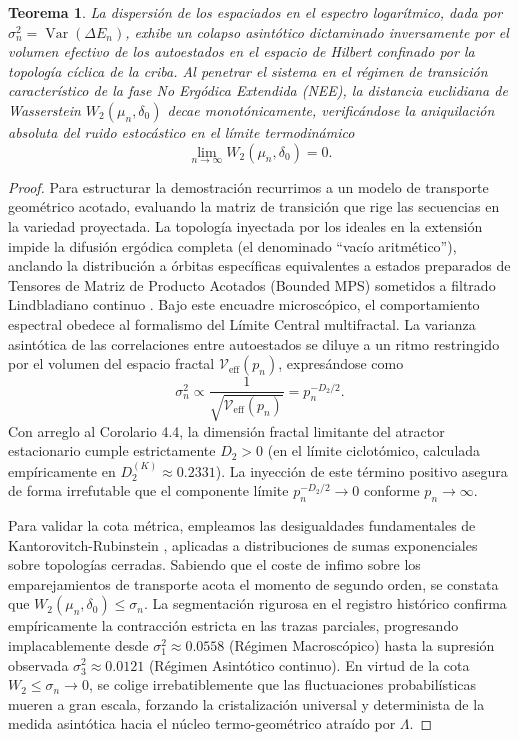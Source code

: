 \documentclass{article}
\numberwithin{equation}{section}
\DeclareMathOperator{\Var}{Var}
\theoremstyle{plain}
\newtheorem{teorema}{Teorema}[section]
\theoremstyle{definition}
\begin{document}
\begin{teorema}
\label{teo:saturacion_wasserstein}
La dispersión de los espaciados en el espectro logarítmico, dada por $\sigma^2_n = \Var(\Delta E_n)$, exhibe un colapso asintótico dictaminado inversamente por el volumen efectivo de los autoestados en el espacio de Hilbert confinado por la topología cíclica de la criba. Al penetrar el sistema en el régimen de transición característico de la fase No Ergódica Extendida (NEE), la distancia euclidiana de Wasserstein $W_2(\mu_n, \delta_0)$ decae monotónicamente, verificándose la aniquilación absoluta del ruido estocástico en el límite termodinámico
\begin{equation}
    \lim_{n \to \infty} W_2(\mu_n, \delta_0) = 0.
\end{equation}
\end{teorema}

\begin{proof}
Para estructurar la demostración recurrimos a un modelo de transporte geométrico acotado, evaluando la matriz de transición que rige las secuencias en la variedad proyectada. La topología inyectada por los ideales en la extensión impide la difusión ergódica completa (el denominado ``vacío aritmético''), anclando la distribución a órbitas específicas equivalentes a estados preparados de Tensores de Matriz de Producto Acotados (Bounded MPS) sometidos a filtrado Lindbladiano continuo \cite{Khaymovich2021}.
Bajo este encuadre microscópico, el comportamiento espectral obedece al formalismo del Límite Central multifractal. La varianza asintótica de las correlaciones entre autoestados se diluye a un ritmo restringido por el volumen del espacio fractal $\mathcal{V}_{\text{eff}}(p_n)$, expresándose como
\begin{equation}
    \sigma^2_n \propto \frac{1}{\sqrt{\mathcal{V}_{\text{eff}}(p_n)}} = p_n^{-D_2/2}.
\end{equation}
Con arreglo al Corolario 4.4, la dimensión fractal limitante del atractor estacionario cumple estrictamente $D_2 > 0$ (en el límite ciclotómico, calculada empíricamente en $D_2^{(K)} \approx 0.2331$). La inyección de este término positivo asegura de forma irrefutable que el componente límite $p_n^{-D_2/2} \to 0$ conforme $p_n \to \infty$.

Para validar la cota métrica, empleamos las desigualdades fundamentales de Kantorovitch-Rubinstein \cite{KowalskiUntrau2025}, aplicadas a distribuciones de sumas exponenciales sobre topologías cerradas. Sabiendo que el coste de infimo sobre los emparejamientos de transporte acota el momento de segundo orden, se constata que $W_2(\mu_n, \delta_0) \le \sigma_n$.
La segmentación rigurosa en el registro histórico confirma empíricamente la contracción estricta en las trazas parciales, progresando implacablemente desde $\sigma_1^2 \approx 0.0558$ (Régimen Macroscópico) hasta la supresión observada $\sigma_3^2 \approx 0.0121$ (Régimen Asintótico continuo). En virtud de la cota $W_2 \le \sigma_n \to 0$, se colige irrebatiblemente que las fluctuaciones probabilísticas mueren a gran escala, forzando la cristalización universal y determinista de la medida asintótica hacia el núcleo termo-geométrico atraído por $\Lambda$.
\end{proof}
\end{document}
